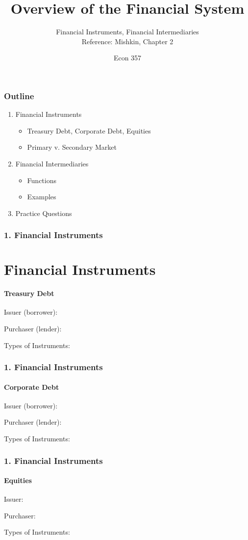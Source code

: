 \documentclass{beamer}
\title{Overview of the Financial System}
\subtitle{Financial Instruments, Financial Intermediaries\\
Reference: Mishkin, Chapter 2}
\author{Econ 357}
\date{\week}
\begin{document}
\frame{\titlepage}

\begin{frame}
    \frametitle{Outline}
    \begin{enumerate}
        \item Financial Instruments
        \begin{itemize}
            \item Treasury Debt, Corporate Debt, Equities
            \item Primary v. Secondary Market
        \end{itemize}
        \item Financial Intermediaries
        \begin{itemize}
            \item Functions
            \item Examples
        \end{itemize}
        \item Practice Questions
    \end{enumerate}
\end{frame}

\begin{frame}[t]
    \frametitle{1. Financial Instruments}
    \section{Financial Instruments}
    \framesubtitle{Treasury Debt}

    Issuer (borrower):
    \vspace{3em}

    Purchaser (lender): 
    \vspace{3em}

    Types of Instruments:

\end{frame}

\begin{frame}[t]
    \frametitle{1. Financial Instruments}
    \framesubtitle{Corporate Debt}

    Issuer (borrower):
    \vspace{3em}

    Purchaser (lender): 
    \vspace{3em}

    Types of Instruments:

\end{frame}

\begin{frame}[t]
    \frametitle{1. Financial Instruments}
    \framesubtitle{Equities}

    Issuer:
    \vspace{3em}

    Purchaser: 
    \vspace{3em}

    Types of Instruments:

\end{frame}
\end{document}
